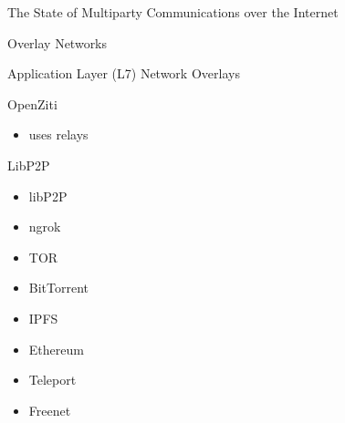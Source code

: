 \begin{frame}[fragile]{The State of Multiparty Communications over the
Internet}
\begin{block}{Overlay Networks}
\begin{block}{Application Layer (L7) Network Overlays}
\begin{block}{OpenZiti}

\begin{itemize}
\tightlist
\item
  uses relays
\end{itemize}
\end{block}

\begin{block}{LibP2P}
\protect\hypertarget{libp2p}{}
\begin{itemize}
\tightlist
\item
  libP2P
\item
  ngrok
\item
  TOR
\item
  BitTorrent
\item
  IPFS
\item
  Ethereum
\item
  Teleport
\item
  Freenet
\end{itemize}
\end{block}
\end{block}
\end{block}
\end{frame}

